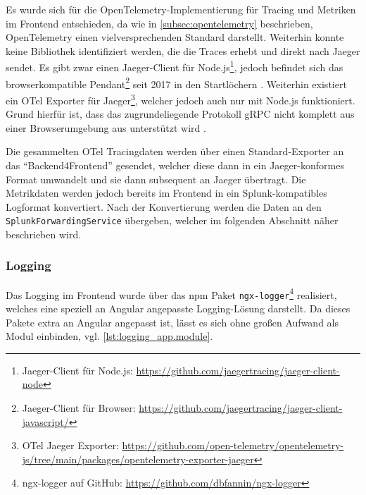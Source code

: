 Es wurde sich für die OpenTelemetry-Implementierung für Tracing und Metriken im Frontend entschieden, da wie in \autoref{subsec:opentelemetry} beschrieben, OpenTelemetry einen vielversprechenden Standard darstellt. Weiterhin konnte keine Bibliothek identifiziert werden, die die Traces erhebt und direkt nach Jaeger sendet. Es gibt zwar einen Jaeger-Client für Node.js\footnote{Jaeger-Client für Node.js: \url{https://github.com/jaegertracing/jaeger-client-node}}, jedoch befindet sich das browserkompatible Pendant\footnote{Jaeger-Client für Browser: \url{https://github.com/jaegertracing/jaeger-client-javascript/}} seit 2017 in den Startlöchern \cite{JaegerJSClientUsageInABrowser}. Weiterhin existiert ein OTel Exporter für Jaeger\footnote{OTel Jaeger Exporter: \url{https://github.com/open-telemetry/opentelemetry-js/tree/main/packages/opentelemetry-exporter-jaeger}}, welcher jedoch auch nur mit Node.js funktioniert. Grund hierfür ist, dass das zugrundeliegende Protokoll gRPC \cite{grpc} nicht komplett aus einer Browserumgebung aus unterstützt wird \cite{grpcWebLimitations}.


Die gesammelten OTel Tracingdaten werden über einen Standard-Exporter an das \enquote{Backend4Frontend} gesendet, welcher diese dann in ein Jaeger-konformes Format umwandelt und sie dann subsequent an Jaeger übertragt. Die Metrikdaten werden jedoch bereits im Frontend in ein Splunk-kompatibles Logformat konvertiert. Nach der Konvertierung werden die Daten an den \texttt{SplunkForwardingService} übergeben, welcher im folgenden Abschnitt näher beschrieben wird.

\subsubsection{Logging}

Das Logging im Frontend wurde über das npm \cite{NPM} Paket \texttt{ngx-logger}\footnote{ngx-logger auf GitHub: \url{https://github.com/dbfannin/ngx-logger}} realisiert, welches eine speziell an Angular angepasste Logging-Lösung darstellt. Da dieses Pakete extra an Angular angepasst ist, lässt es sich ohne großen Aufwand als Modul einbinden, vgl. \autoref{lst:logging_app.module}.



